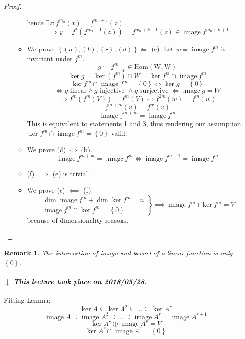 \documentclass{article}
\newtheorem{remark}{Remark}  \numberwithin{remark}{section}
\newcommand{\set}[1]{\left\{#1\right\}}
\newcommand{\dateref}[1]{%
  \begin{mdframed}[backgroundcolor=gray!10,innerbottommargin=0pt,innertopmargin=0pt]
    \paragraph{\textit{$\downarrow$ This lecture took place on #1.}}%
  \end{mdframed}%
}
\DeclareMathOperator{\im}{image}
\begin{document}
\begin{proof}
\begin{enumerate}
\begin{itemize}
          hence $\exists z: f^{m_0}(x) = f^{m_0 + 1}(z)$.
          \[ \implies y = f^k(f^{m_0 + 1}(z)) = f^{m_0 + k + 1}(z) \in \im{f^{m_0 + k + 1}} \]
        \item We prove $\set{(a), (b), (c), (d)} \iff$ (e).
          Let $w = \im{f^m}$ is invariant under $f^m$.
          \[ g \coloneqq f^m|_W \in \operatorname{Hom(W, W)} \]
          \[ \ker{g} = \ker(f^m) \cap W = \ker{f^m} \cap \im{f^m} \]
          \[ \ker{f^m} \cap \im{f^m} = \set{0} \iff \ker{g} = \set{0} \]
          \[ \iff g \text{ linear} \land g \text{ injective } \land g \text{ surjective } \iff \im{g} = W \]
          \[ \iff f^m(f^m(V)) = f^m(V) \iff f^{2m}(w) = f^m(w) \]
          \[ f^{m+m}(v) = f^m(v) \]
          \[ \im{f^{m+m}} = \im{f^m} \]
          This is equivalent to statements 1 and 3, thus rendering our assumption $\ker{f^m} \cap \im{f^m} = \set{0}$ valid.
        \item We prove (d) $\iff$ (b).
          \[ \im{f^{m+m}} = \im{f^m} \iff \im{f^{m+1}} = \im{f^m} \]
        \item (f) $\implies$ (e) is trivial.
        \item We prove (e) $\impliedby$ (f).
          \[
            \left.\begin{array}{c}
              \dim\im{f^m} + \dim\ker{f^m} = n \\
              \im{f^m} \cap \ker{f^m} = \set{0}
            \end{array}\right\}
            \implies \im{f^m} \dot{+} \ker{f^m} = V
          \]
          because of dimensionality reasons.
      \end{itemize}
  \end{enumerate}
\end{proof}

\begin{remark}
  The intersection of image and kernel of a linear function is only $\set{0}$.
\end{remark}

\dateref{2018/05/28}

Fitting Lemma:
\[ \ker{A} \subseteq \ker{A^2} \subseteq \dots \subseteq \ker{A^r} \]
\[ \im{A} \supseteq \im{A^2} \supseteq \dots \supseteq \im{A^r} = \im{A^{r+1}} \]
\[ \ker{A^r} \oplus \im{A^r} = V \]
\[ \ker{A^r} \cap \im{A^r} = \set{0} \]
\end{document}
